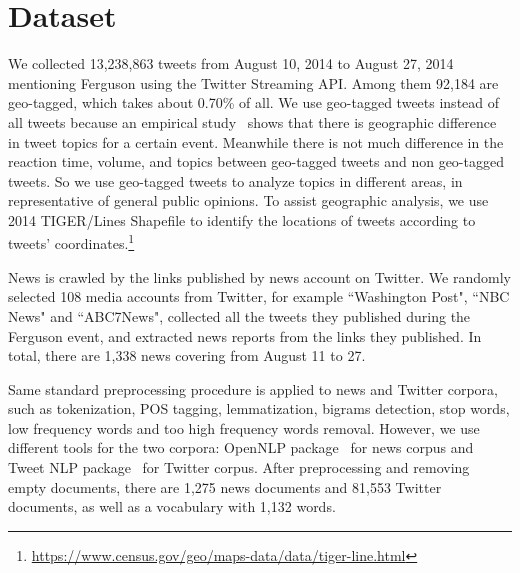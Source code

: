 \section{Dataset}
\label{sec:dat}

We collected 13,238,863 tweets from August 10, 2014 to August 27, 2014 mentioning Ferguson using the Twitter Streaming API.
Among them 92,184 are geo-tagged, which takes about 0.70\% of all.
We use geo-tagged tweets instead of all tweets because an empirical study~\cite{he2015uncovering} shows that there is geographic difference in tweet topics for a certain event.
Meanwhile there is not much difference in the reaction time, volume, and topics between geo-tagged tweets and non geo-tagged tweets.
So we use geo-tagged tweets to analyze topics in different areas, in representative of general public opinions.
To assist geographic analysis, we use 2014 TIGER/Lines Shapefile to identify the locations of tweets according to tweets' coordinates.\footnote{\url{https://www.census.gov/geo/maps-data/data/tiger-line.html}}

News is crawled by the links published by news account on Twitter. We randomly selected 108 media accounts from Twitter, for example ``Washington Post", ``NBC News" and ``ABC7News", collected all the tweets they published during the Ferguson event, and extracted news reports from the links they published. In total, there are 1,338 news covering from August 11 to 27.

Same standard preprocessing procedure is applied to news and Twitter corpora, such as tokenization, POS tagging, lemmatization, bigrams detection, stop words, low frequency words and too high frequency words removal. However, we use different tools for the two corpora: OpenNLP package~\cite{baldridge2005opennlp} for news corpus and Tweet NLP package~\cite{owoputi2013improved} for Twitter corpus. After preprocessing and removing empty documents, there are 1,275 news documents and 81,553 Twitter documents, as well as a vocabulary with 1,132 words.







